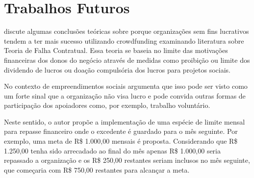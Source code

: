 \chapter{Trabalhos Futuros}

\citeauthor{belleflamme2010} discute algumas conclusões teóricas sobre porque organizações sem fins lucrativos tendem a ter mais sucesso utilizando crowdfunding examinando literatura sobre Teoria de Falha Contratual. Essa teoria se baseia no limite das motivações financeiras dos donos do negócio através de medidas como proibição ou limite dos dividendo de lucros ou doação compulsória dos lucros para projetos sociais.

No contexto de empreendimentos sociais \citeauthor{lehner2013crowdfunding} argumenta que isso pode ser visto como um forte sinal que a organização não visa lucro e pode convida outras formas de participação dos apoiadores como, por exemplo, trabalho voluntário.

Neste sentido, o autor propõe a implementação de uma espécie de limite mensal para repasse financeiro onde o excedente é guardado para o mês seguinte. Por exemplo, uma meta de R\$ 1.000,00 mensais é proposta. Considerando que R\$ 1.250,00 tenha sido arrecadado ao final do mês apenas R\$ 1.000,00 seria repassado a organização e os R\$ 250,00 restantes seriam inclusos no mês seguinte, que começaria com R\$ 750,00 restantes para alcançar a meta.